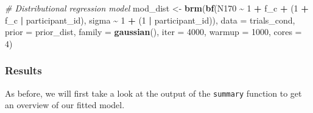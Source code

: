 \documentclass[
  doc,12pt,floatsintext]{apa7}
\newenvironment{Shaded}{\begin{snugshade}}{\end{snugshade}}
\newcommand{\AttributeTok}[1]{\textcolor[rgb]{0.13,0.29,0.53}{#1}}
\newcommand{\CommentTok}[1]{\textcolor[rgb]{0.56,0.35,0.01}{\textit{#1}}}
\newcommand{\DecValTok}[1]{\textcolor[rgb]{0.00,0.00,0.81}{#1}}
\newcommand{\FunctionTok}[1]{\textcolor[rgb]{0.13,0.29,0.53}{\textbf{#1}}}
\newcommand{\NormalTok}[1]{#1}
\newcommand{\OtherTok}[1]{\textcolor[rgb]{0.56,0.35,0.01}{#1}}
\newcommand{\SpecialCharTok}[1]{\textcolor[rgb]{0.81,0.36,0.00}{\textbf{#1}}}
\begin{document}
\begin{Shaded}
\begin{Highlighting}[]
\CommentTok{\# Distributional regression model }
\NormalTok{mod\_dist }\OtherTok{\textless{}{-}} \FunctionTok{brm}\NormalTok{(}\FunctionTok{bf}\NormalTok{(N170 }\SpecialCharTok{\textasciitilde{}} \DecValTok{1} \SpecialCharTok{+}\NormalTok{ f\_c }\SpecialCharTok{+}\NormalTok{ (}\DecValTok{1} \SpecialCharTok{+}\NormalTok{ f\_c }\SpecialCharTok{|}\NormalTok{ participant\_id), }
\NormalTok{                   sigma }\SpecialCharTok{\textasciitilde{}} \DecValTok{1} \SpecialCharTok{+}\NormalTok{ (}\DecValTok{1} \SpecialCharTok{|}\NormalTok{ participant\_id)), }
                \AttributeTok{data =}\NormalTok{ trials\_cond, }
                \AttributeTok{prior =}\NormalTok{ prior\_dist,}
                \AttributeTok{family =} \FunctionTok{gaussian}\NormalTok{(),}
                \AttributeTok{iter =} \DecValTok{4000}\NormalTok{,}
                \AttributeTok{warmup =} \DecValTok{1000}\NormalTok{,}
                \AttributeTok{cores =} \DecValTok{4}\NormalTok{) }
\end{Highlighting}
\end{Shaded}

\subsubsection{Results}\label{results-2}

As before, we will first take a look at the output of the \texttt{summary} function to get an overview of our fitted model.



\footnotesize
\end{document}
